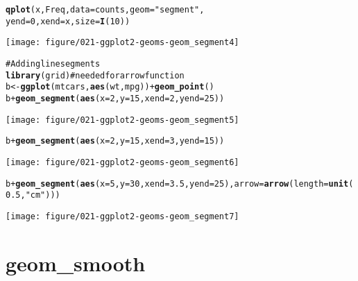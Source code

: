 \documentclass[a4paper,titlepage]{tufte-handout}\usepackage{graphicx, color}
\makeatletter
\def\maxwidth{ %
  \ifdim\Gin@nat@width>\linewidth
    \linewidth
  \else
    \Gin@nat@width
  \fi
}
\newcommand{\hlfunctioncall}[1]{\textcolor[rgb]{0.501960784313725,0,0.329411764705882}{\textbf{#1}}}%
\newcommand{\hlstring}[1]{\textcolor[rgb]{0.6,0.6,1}{#1}}%
\newcommand{\hlcomment}[1]{\textcolor[rgb]{0.180392156862745,0.6,0.341176470588235}{#1}}%
\newenvironment{kframe}{%
 \def\at@end@of@kframe{}%
 \ifinner\ifhmode%
  \def\at@end@of@kframe{\end{minipage}}%
  \begin{minipage}{\columnwidth}%
 \fi\fi%
 \def\FrameCommand##1{\hskip\@totalleftmargin \hskip-\fboxsep
 \colorbox{shadecolor}{##1}\hskip-\fboxsep
     \hskip-\linewidth \hskip-\@totalleftmargin \hskip\columnwidth}%
 \MakeFramed {\advance\hsize-\width
   \@totalleftmargin\z@ \linewidth\hsize
   \@setminipage}}%
 {\par\unskip\endMakeFramed%
 \at@end@of@kframe}
\newenvironment{knitrout}{}{} %
\makeatother
\begin{document}
\begin{knitrout}
\begin{kframe}
\begin{alltt}
\hlfunctioncall{qplot}(x, Freq, data = counts, geom = \hlstring{"segment"},
  yend = 0, xend = x, size = \hlfunctioncall{I}(10))
\end{alltt}
\end{kframe}\texttt{[image: figure/021-ggplot2-geoms-geom\_segment4]} \begin{kframe}\begin{alltt}
\hlcomment{# Adding line segments}
\hlfunctioncall{library}(grid) \hlcomment{# needed for arrow function}
b <- \hlfunctioncall{ggplot}(mtcars, \hlfunctioncall{aes}(wt, mpg)) + \hlfunctioncall{geom_point}()
b + \hlfunctioncall{geom_segment}(\hlfunctioncall{aes}(x = 2, y = 15, xend = 2, yend = 25))
\end{alltt}
\end{kframe}\texttt{[image: figure/021-ggplot2-geoms-geom\_segment5]} \begin{kframe}\begin{alltt}
b + \hlfunctioncall{geom_segment}(\hlfunctioncall{aes}(x = 2, y = 15, xend = 3, yend = 15))
\end{alltt}
\end{kframe}\texttt{[image: figure/021-ggplot2-geoms-geom\_segment6]} \begin{kframe}\begin{alltt}
b + \hlfunctioncall{geom_segment}(\hlfunctioncall{aes}(x = 5, y = 30, xend = 3.5, yend = 25), arrow = \hlfunctioncall{arrow}(length = \hlfunctioncall{unit}(0.5, \hlstring{"cm"})))
\end{alltt}
\end{kframe}\texttt{[image: figure/021-ggplot2-geoms-geom\_segment7]} 
\end{knitrout}


\section{geom\_smooth}
\end{document}
